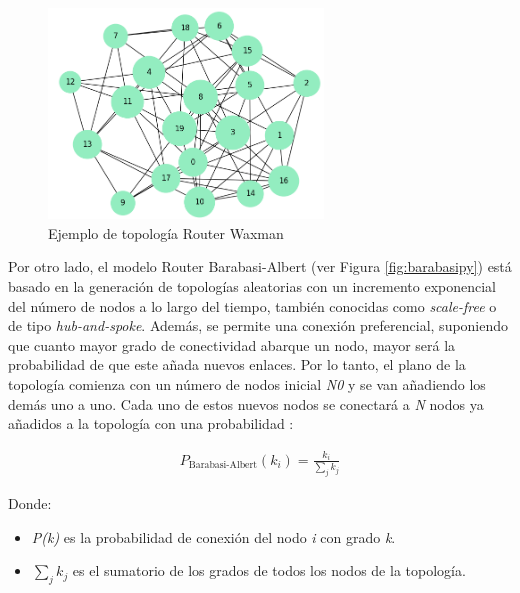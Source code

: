 \begin{figure}[h!]
    \centering
    \includegraphics[width=0.65\textwidth]{img/diseno/waxmanpy.PNG}
    \caption{Ejemplo de topología Router Waxman}
    \label{fig:waxmanpy}
\end{figure}

\vspace{3mm}

Por otro lado, el modelo Router Barabasi-Albert (ver Figura \ref{fig:barabasipy}) está basado en la generación de topologías aleatorias con un incremento exponencial del número de nodos a lo largo del tiempo, también conocidas como \textit{scale-free} o de tipo \textit{hub-and-spoke}. Además, se permite una conexión preferencial, suponiendo que cuanto mayor grado de conectividad abarque un nodo, mayor será la probabilidad de que este añada nuevos enlaces. Por lo tanto, el plano de la topología comienza con un número de nodos inicial \textit{N0} y se van añadiendo los demás uno a uno. Cada uno de estos nuevos nodos se conectará a \textit{N} nodos ya añadidos a la topología con una probabilidad \cite{brite_zegura}:

\begin{equation}
    \begin{aligned}
        P_{\text{Barabasi-Albert}}(k_i) = \frac{k_i}{\sum_{j}^{}k_j}
    \end{aligned}
\end{equation} 
    
    Donde:
\begin{itemize}
    \renewcommand{\labelitemi}{}
    \item \textit{P(k)} es la probabilidad de conexión del nodo \textit{i} con grado \textit{k}.
    \item $\sum_{j}^{}k_j$ es el sumatorio de los grados de todos los nodos de la topología.
\end{itemize}

